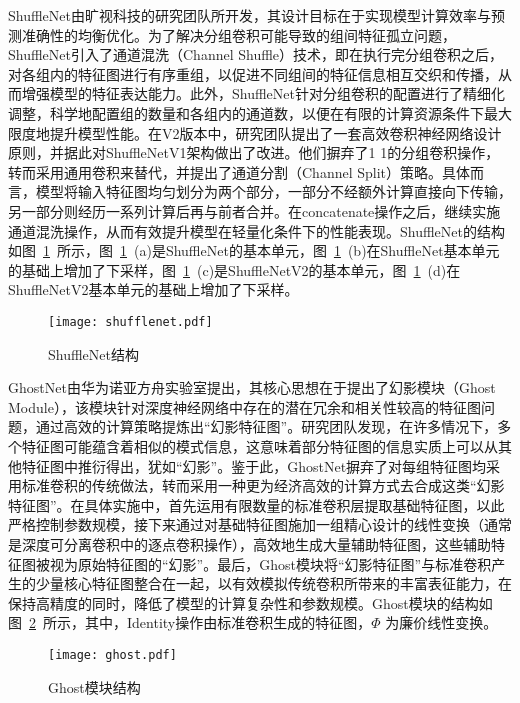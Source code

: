 ShuffleNet\cite{zhang2018shufflenet}由旷视科技的研究团队所开发，其设计目标在于实现模型计算效率与预测准确性的均衡优化。为了解决分组卷积可能导致的组间特征孤立问题，ShuffleNet引入了通道混洗（Channel Shuffle）技术，即在执行完分组卷积之后，对各组内的特征图进行有序重组，以促进不同组间的特征信息相互交织和传播，从而增强模型的特征表达能力。此外，ShuffleNet针对分组卷积的配置进行了精细化调整，科学地配置组的数量和各组内的通道数，以便在有限的计算资源条件下最大限度地提升模型性能。在V2\cite{ma2018shufflenet}版本中，研究团队提出了一套高效卷积神经网络设计原则，并据此对ShuffleNetV1架构做出了改进。他们摒弃了1 \times 1的分组卷积操作，转而采用通用卷积来替代，并提出了通道分割（Channel Split）策略。具体而言，模型将输入特征图均匀划分为两个部分，一部分不经额外计算直接向下传输，另一部分则经历一系列计算后再与前者合并。在concatenate操作之后，继续实施通道混洗操作，从而有效提升模型在轻量化条件下的性能表现。ShuffleNet的结构如图~\ref{fig:shufflenet}~所示，图~\ref{fig:shufflenet}~(a)是ShuffleNet的基本单元，图~\ref{fig:shufflenet}~(b)在ShuffleNet基本单元的基础上增加了下采样，图~\ref{fig:shufflenet}~(c)是ShuffleNetV2的基本单元，图~\ref{fig:shufflenet}~(d)在ShuffleNetV2基本单元的基础上增加了下采样。
\begin{figure}
    \centering
    \texttt{[image: shufflenet.pdf]}
    \caption{ShuffleNet结构}
    \label{fig:shufflenet}
\end{figure}

GhostNet\cite{han2020ghostnet}由华为诺亚方舟实验室提出，其核心思想在于提出了幻影模块（Ghost Module），该模块针对深度神经网络中存在的潜在冗余和相关性较高的特征图问题，通过高效的计算策略提炼出“幻影特征图”。研究团队发现，在许多情况下，多个特征图可能蕴含着相似的模式信息，这意味着部分特征图的信息实质上可以从其他特征图中推衍得出，犹如“幻影”。鉴于此，GhostNet摒弃了对每组特征图均采用标准卷积的传统做法，转而采用一种更为经济高效的计算方式去合成这类“幻影特征图”。在具体实施中，首先运用有限数量的标准卷积层提取基础特征图，以此严格控制参数规模，接下来通过对基础特征图施加一组精心设计的线性变换（通常是深度可分离卷积中的逐点卷积操作），高效地生成大量辅助特征图，这些辅助特征图被视为原始特征图的“幻影”。最后，Ghost模块将“幻影特征图”与标准卷积产生的少量核心特征图整合在一起，以有效模拟传统卷积所带来的丰富表征能力，在保持高精度的同时，降低了模型的计算复杂性和参数规模。Ghost模块的结构如图~\ref{fig:ghost}~所示，其中，Identity操作由标准卷积生成的特征图，\(\Phi\) 为廉价线性变换。
\begin{figure}
    \centering
    \texttt{[image: ghost.pdf]}
    \caption{Ghost模块结构}
    \label{fig:ghost}
\end{figure}

